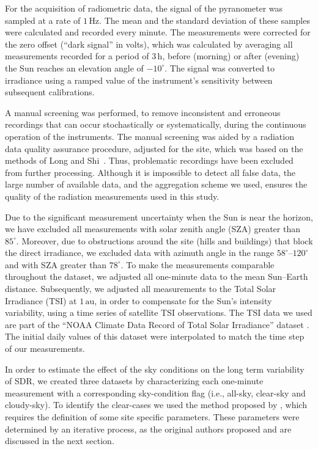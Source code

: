 \documentclass[applsci,article,submit,moreauthors,pdftex]{Definitions/mdpi}
\begin{document}
For the acquisition of radiometric data, the signal of the pyranometer
was sampled at a rate of \(1\,\text{Hz}\). The mean and the standard
deviation of these samples were calculated and recorded every minute.
The measurements were corrected for the zero offset (``dark signal'' in
volts), which was calculated by averaging all measurements recorded for
a period of \(3\,\text{h}\), before (morning) or after (evening) the Sun
reaches an elevation angle of \(-10^\circ\). The signal was converted to
irradiance using a ramped value of the instrument's sensitivity between
subsequent calibrations.

A manual screening was performed, to remove inconsistent and erroneous
recordings that can occur stochastically or systematically, during the
continuous operation of the instruments. The manual screening was aided
by a radiation data quality assurance procedure, adjusted for the site,
which was based on the methods of Long and
Shi~\citep{Long2006, Long2008a}. Thus, problematic recordings have been
excluded from further processing. Although it is impossible to detect
all false data, the large number of available data, and the aggregation
scheme we used, ensures the quality of the radiation measurements used
in this study.

Due to the significant measurement uncertainty when the Sun is near the
horizon, we have excluded all measurements with solar zenith angle (SZA)
greater than \(85^\circ\). Moreover, due to obstructions around the site
(hills and buildings) that block the direct irradiance, we excluded data
with azimuth angle in the range \(58^{\circ}\)--\(120^{\circ}\) and with
SZA greater than \(78^{\circ}\). To make the measurements comparable
throughout the dataset, we adjusted all one-minute data to the mean
Sun--Earth distance. Subsequently, we adjusted all measurements to the
Total Solar Irradiance (TSI) at \(1\,\text{au}\), in order to compensate
for the Sun's intensity variability, using a time series of satellite
TSI observations. The TSI data we used are part of the ``NOAA Climate
Data Record of Total Solar Irradiance'' dataset \citep{Coddington2005}.
The initial daily values of this dataset were interpolated to match the
time step of our measurements.

In order to estimate the effect of the sky conditions on the long term
variability of SDR, we created three datasets by characterizing each
one-minute measurement with a corresponding sky-condition flag (i.e.,
all-sky, clear-sky and cloudy-sky). To identify the clear-cases we used
the method proposed by \citet{Reno2016}, which requires the definition
of some site specific parameters. These parameters were determined by an
iterative process, as the original authors proposed and are discussed in
the next section.
\end{document}
